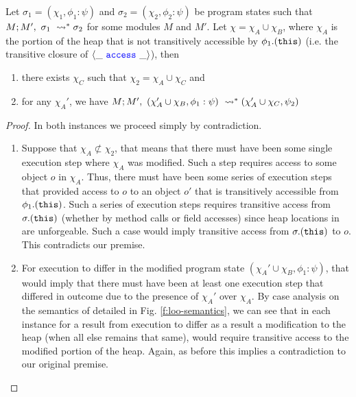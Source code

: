 \begin{lemma}
\label{lemma:scoped-execution}
Let $\sigma_1 = (\chi_1, \phi_1 : \psi)$ and $\sigma_2 = (\chi_2, \phi_2 : \psi)$ be program states such that
$M ; M',\ \sigma_1\ \leadsto^* \sigma_2$ for some modules $M$ and $M'$.
Let $\chi = \chi_A \cup \chi_B$, where $\chi_A$ is the portion of the heap that is not
transitively accessible by $\phi_1.({\texttt{this}})$ (i.e. the transitive closure of $\langle \_\ {\color{blue}\texttt{access}}\ \_ \rangle$), then 
\begin{enumerate}
\item
there exists $\chi_C$ such that $\chi_2 = \chi_A \cup \chi_C$ and 
\item
for any $\chi_A'$, we have $M ; M',\ (\chi_A' \cup \chi_B, \phi_1 : \psi)\ \leadsto^* (\chi_A' \cup \chi_C, \psi_2)$
\end{enumerate}
\end{lemma}
\begin{proof}
In both instances we proceed simply by contradiction. 

\begin{enumerate}
\item
Suppose that $\chi_A \not\subset \chi_2$, that means that there must 
have been some single execution step where $\chi_A$ was modified. Such a step requires access to some object $o$
in $\chi_A$. Thus, there must have been some series of execution steps that provided access to $o$ to an object $o'$
that is transitively accessible from $\phi_1.({\texttt{this}})$. Such a series of execution steps requires transitive
access from $\sigma.({\texttt{this}})$ (whether by method calls or field accesses) since heap locations in \Loo are unforgeable.
Such a case would imply transitive access from $\sigma.({\texttt{this}})$ to $o$. This contradicts our premise.

\item
For execution to differ in the modified program state $(\chi_A' \cup \chi_B, \phi_1 : \psi)$,
that would imply that there must have been at least one execution step that differed in outcome due to the presence of $\chi_A'$ over $\chi_A$.
By case analysis on the semantics of \Loo detailed in Fig. \ref{f:loo-semantics}, we can see that in each instance for 
a result from execution to differ as a result a modification to the heap (when all else remains that same), would require transitive access 
to the modified portion of the heap. Again, as before this implies a contradiction to our original premise.
\end{enumerate}
\end{proof}

